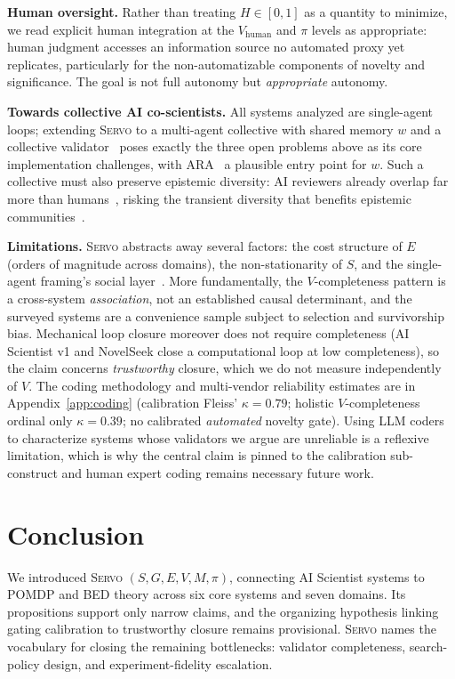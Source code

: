 \documentclass{article}
\newcommand{\sgmvpi}{$(S, G, E, V, M, \pi)$}
\newcommand{\framework}{\textsc{Servo}}
\begin{document}
\textbf{Human oversight.} Rather than treating $H \in [0,1]$ as a quantity to minimize, we read explicit human integration at the $V_\text{human}$ and $\pi$ levels as appropriate: human judgment accesses an information source no automated proxy yet replicates, particularly for the non-automatizable components of novelty and significance. The goal is not full autonomy but \emph{appropriate} autonomy.

\textbf{Towards collective AI co-scientists.} All systems analyzed are single-agent loops; extending \framework{} to a multi-agent collective with shared memory $w$ and a collective validator~\citep{taniguchi2024cpc} poses exactly the three open problems above as its core implementation challenges, with ARA~\citep{liu2026lasthuman} a plausible entry point for $w$. Such a collective must also preserve epistemic diversity: AI reviewers already overlap far more than humans~\citep{kim2026aireviewers}, risking the transient diversity that benefits epistemic communities~\citep{zollman2010epistemic}.

\textbf{Limitations.} \framework{} abstracts away several factors: the cost structure of $E$ (orders of magnitude across domains), the non-stationarity of $S$, and the single-agent framing's social layer~\citep{taniguchi2024cpc}. More fundamentally, the $V$-completeness pattern is a cross-system \emph{association}, not an established causal determinant, and the surveyed systems are a convenience sample subject to selection and survivorship bias. Mechanical loop closure moreover does not require completeness (AI Scientist v1 and NovelSeek close a computational loop at low completeness), so the claim concerns \emph{trustworthy} closure, which we do not measure independently of $V$. The coding methodology and multi-vendor reliability estimates are in Appendix~\ref{app:coding} (calibration Fleiss' $\kappa{=}0.79$; holistic $V$-completeness ordinal only $\kappa{=}0.39$; no calibrated \emph{automated} novelty gate). Using LLM coders to characterize systems whose validators we argue are unreliable is a reflexive limitation, which is why the central claim is pinned to the calibration sub-construct and human expert coding remains necessary future work.

\section{Conclusion}
\label{sec:conclusion}

We introduced \framework{} \sgmvpi{}, connecting AI Scientist systems to POMDP and BED theory across six core systems and seven domains. Its propositions support only narrow claims, and the organizing hypothesis linking gating calibration to trustworthy closure remains provisional. \framework{} names the vocabulary for closing the remaining bottlenecks: validator completeness, search-policy design, and experiment-fidelity escalation.
\end{document}
